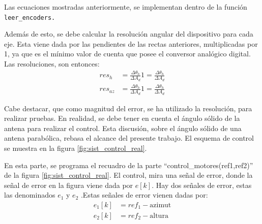 Las ecuaciones mostradas anteriormente, se implementan dentro de la función \texttt{leer_encoders.} 

Además de esto, se debe calcular la resolución angular del dispositivo para cada eje. Esta viene dada por las pendientes de las rectas anteriores, multiplicadas por 1, ya que es el mínimo valor de cuenta que posee el conversor analógico digital. Las resoluciones, son entonces: 
\begin{equation}
	\begin{split}
		res_h &= \frac{ \Delta\theta_h}{\Delta A_d}  1 = \frac{ \Delta\theta_h}{\Delta A_d} \\  
		res_{az} &= \frac{ \Delta\theta_h}{\Delta A_d}  1 = \frac{ \Delta\theta_h}{\Delta A_d}   	
	\end{split}
\end{equation}

Cabe destacar, que como magnitud del error, se ha utilizado la resolución, para realizar pruebas. En realidad, se debe tener en cuenta el ángulo sólido de la antena para realizar el control. Esta discusión, sobre el ángulo sólido de una antena parabólica, rebasa el alcance del presente trabajo.
El esquema de control se muestra en la figura  \ref{fig:sist_control_real}. 

En esta parte, se programa el recuadro de la parte ``control\_motores(ref1,ref2)'' de la figura \ref{fig:sist_control_real}. El control, mira una señal de error, donde la señal de error en la figura viene dada por $e[k]$. Hay dos señales de error, estas las denominados $e_1 $ y $e_2$ .Estas señales de error vienen dadas por: 
\begin{equation}
	\begin{split}
		e_1[k]&=ref_1 - \text{azimut}  \\
	    e_2[k]&=ref_2 - \text{altura}  
	\end{split}
\end{equation}

